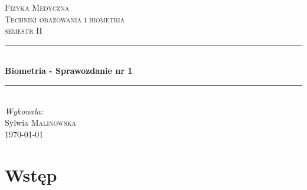 	
	\begin{titlepage}
		
		\newcommand{\HRule}{\rule{\linewidth}{0.5mm}} %
		
		\center %
		
		
		\textsc{\LARGE Fizyka Medyczna}\\[1.5cm] %
		\textsc{\Large Techniki obazowania i biometria}\\[0.5cm] %
		\textsc{\large semestr II}\\[0.5cm] %
		
		
		\HRule \\[0.4cm]
		{ \huge \bfseries Biometria - Sprawozdanie nr 1}\\[0.4cm] %
		\HRule \\[1.5cm]
		
		\Large \emph{Wykonała:}\\
		Sylwia \textsc{Malinowska}\\[3cm] %
		
		
		{\large \today}\\[2cm] %

		\vfill %
		
	\end{titlepage}
	

	
	\section{Wstęp}
	
